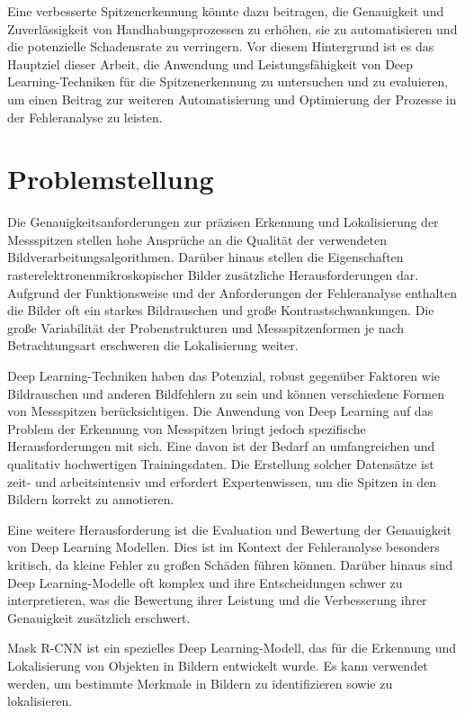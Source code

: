 Eine verbesserte Spitzenerkennung könnte dazu beitragen, die Genauigkeit und Zuverlässigkeit von Handhabungsprozessen zu erhöhen, sie zu automatisieren und die potenzielle Schadensrate zu verringern.
Vor diesem Hintergrund ist es das Hauptziel dieser Arbeit, die Anwendung und Leistungsfähigkeit von Deep Learning-Techniken für die Spitzenerkennung zu untersuchen und zu evaluieren, um einen Beitrag zur weiteren Automatisierung und Optimierung der Prozesse in der Fehleranalyse zu leisten.
\section{Problemstellung}
Die Genauigkeitsanforderungen zur präzisen Erkennung und Lokalisierung der Messspitzen stellen hohe Ansprüche an die Qualität der verwendeten Bildverarbeitungsalgorithmen.
Darüber hinaus stellen die Eigenschaften rasterelektronenmikroskopischer Bilder zusätzliche Herausforderungen dar.
Aufgrund der Funktionsweise und der Anforderungen der Fehleranalyse enthalten die Bilder oft ein starkes Bildrauschen und große Kontrastschwankungen. Die große Variabilität der Probenstrukturen und Messspitzenformen je nach Betrachtungsart erschweren die Lokalisierung weiter.

Deep Learning-Techniken haben das Potenzial, robust gegenüber Faktoren wie Bildrauschen und anderen Bildfehlern zu sein und können verschiedene Formen von Messspitzen berücksichtigen.
Die Anwendung von Deep Learning auf das Problem der Erkennung von Messpitzen bringt jedoch spezifische Herausforderungen mit sich.
Eine davon ist der Bedarf an umfangreichen und qualitativ hochwertigen Trainingsdaten. Die Erstellung solcher Datensätze ist zeit- und arbeitsintensiv und erfordert Expertenwissen, um die Spitzen in den Bildern korrekt zu annotieren.

Eine weitere Herausforderung ist die Evaluation und Bewertung der Genauigkeit von Deep Learning Modellen. Dies ist im Kontext der Fehleranalyse besonders kritisch, da kleine Fehler zu großen Schäden führen können.
Darüber hinaus sind Deep Learning-Modelle oft komplex und ihre Entscheidungen schwer zu interpretieren, was die Bewertung ihrer Leistung und die Verbesserung ihrer Genauigkeit zusätzlich erschwert.

Mask R-CNN ist ein spezielles Deep Learning-Modell, das für die Erkennung und Lokalisierung von Objekten in Bildern entwickelt wurde. Es kann verwendet werden, um bestimmte Merkmale in Bildern zu identifizieren sowie zu lokalisieren.

